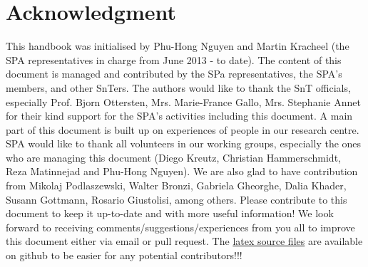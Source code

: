 \section*{Acknowledgment}
This handbook was initialised by Phu-Hong Nguyen and Martin Kracheel (the SPA representatives in charge from June 2013 - to date). The content of this document is managed and contributed by the SPa representatives, the SPA's members, and other SnTers. The authors would like to thank the SnT officials, especially Prof. Bjorn Ottersten, Mrs. Marie-France Gallo, Mrs. Stephanie Annet for their kind support for the SPA's activities including this document. 
A main part of this document is built up on experiences of people in our research centre. 
SPA would like to thank all volunteers in our working groups, especially the ones who are managing this document (Diego Kreutz, Christian Hammerschmidt, Reza Matinnejad and Phu-Hong Nguyen). 
We are also glad to have contribution from Mikolaj Podlaszewski, Walter Bronzi, Gabriela Gheorghe, Dalia Khader, Susann Gottmann, Rosario Giustolisi, among others. 
Please contribute to this document to keep it up-to-date and with more useful information! 
We look forward to receiving comments/suggestions/experiences from you all to improve this document either via email or pull request. 
The \href{https://github.com/SPAlux/handbook}{latex source files} are available on github to be easier for any potential contributors!!!
